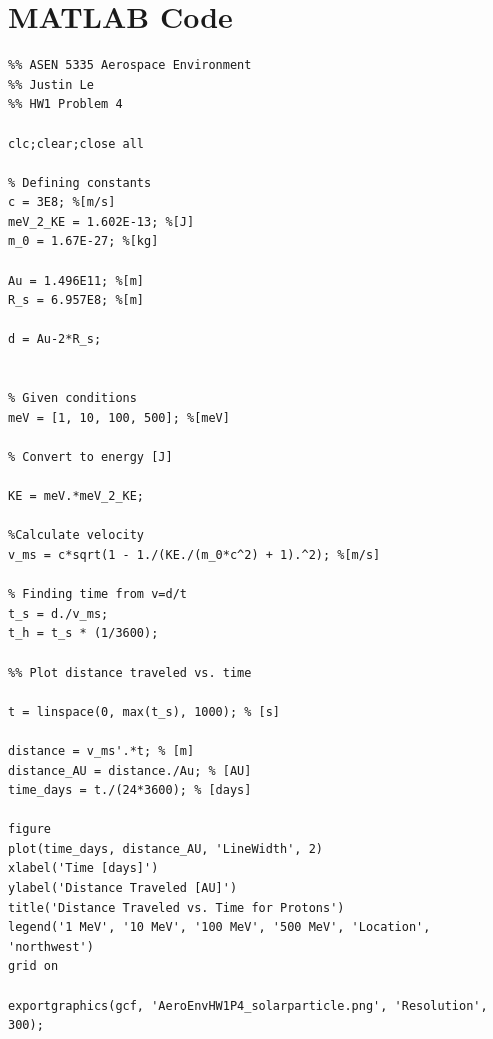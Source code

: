 \documentclass[11pt]{article}
\begin{document}
\newpage
\section*{MATLAB Code}
\begin{verbatim}
%% ASEN 5335 Aerospace Environment
%% Justin Le
%% HW1 Problem 4

clc;clear;close all

% Defining constants
c = 3E8; %[m/s]
meV_2_KE = 1.602E-13; %[J]
m_0 = 1.67E-27; %[kg]

Au = 1.496E11; %[m]
R_s = 6.957E8; %[m]

d = Au-2*R_s;


% Given conditions
meV = [1, 10, 100, 500]; %[meV]

% Convert to energy [J]

KE = meV.*meV_2_KE;

%Calculate velocity
v_ms = c*sqrt(1 - 1./(KE./(m_0*c^2) + 1).^2); %[m/s] 

% Finding time from v=d/t
t_s = d./v_ms;
t_h = t_s * (1/3600);

%% Plot distance traveled vs. time

t = linspace(0, max(t_s), 1000); % [s]

distance = v_ms'.*t; % [m]
distance_AU = distance./Au; % [AU]
time_days = t./(24*3600); % [days]

figure
plot(time_days, distance_AU, 'LineWidth', 2)
xlabel('Time [days]')
ylabel('Distance Traveled [AU]')
title('Distance Traveled vs. Time for Protons')
legend('1 MeV', '10 MeV', '100 MeV', '500 MeV', 'Location', 'northwest')
grid on

exportgraphics(gcf, 'AeroEnvHW1P4_solarparticle.png', 'Resolution', 300);
\end{verbatim}
\end{document}

